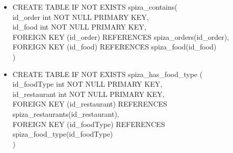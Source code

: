 \documentclass[12pt]{scrartcl}
\begin{document}
\begin{itemize}
    id\_order int NOT NULL PRIMARY KEY AUTO\_INCREMENT,\\
    id\_user int NOT NULL,\\
    id\_restaurant int NOT NULL,\\
    note varchar(50),\\
    feedback varchar(100),\\
    rating float,\\
    thumbs\_up int,\\
    thumbs\_down int, \\
    FOREIGN KEY (id\_restaurant) REFERENCES spiza\_restaurants(id\_restaurant),\\
    FOREIGN KEY (id\_user) REFERENCES spiza\textunderscore users(id\_user)\\
    )
    \item[] CREATE TABLE IF NOT EXISTS spiza\_contains(\\
    id\_order int NOT NULL PRIMARY KEY,\\
    id\_food int NOT NULL PRIMARY KEY,\\
    FOREIGN KEY (id\_order) REFERENCES spiza\_orders(id\_order),\\
    FOREIGN KEY (id\_food) REFERENCES spiza\_food(id\_food)\\
    )
    \item[] CREATE TABLE IF NOT EXISTS spiza\_has\_food\_type (\\
    id\_foodType int NOT NULL PRIMARY KEY,\\
    id\_restaurant int NOT NULL PRIMARY KEY,\\
    FOREIGN KEY (id\_restaurant) REFERENCES spiza\_restaurants(id\_restaurant),\\
    FOREIGN KEY (id\_foodType) REFERENCES spiza\_food\_type(id\_foodType)\\
    )
\end{itemize}
\end{document}

